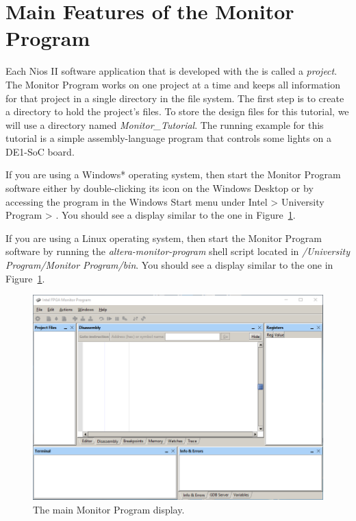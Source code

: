 \documentclass[11pt, twoside, pdftex]{article}
\begin{document}
\section{Main Features of the Monitor Program}

Each Nios II software application that is developed with the
\productNameMed{} is called a {\it project}. 
The Monitor Program works on one project at a time and keeps all information for that project in a single directory in the file
system. The first step is to create a directory to hold the project's files. To store the design files for this tutorial, 
we will use a directory named {\it Monitor\_Tutorial}. 
The running example for this tutorial is a simple 
assembly-language program that controls some lights on a 
DE1-SoC board.

If you are using a Windows* operating system, then
start the Monitor Program software either by double-clicking its
icon on the Windows Desktop or by accessing the program in the
{\sf Windows Start} menu under 
{\sf Intel > University Program > \productNameMed{}}. 
You should see a display similar to the one in Figure~\ref{fig:3}.

If you are using a Linux operating system, then
start the Monitor Program software by running the
{\it altera-monitor-program} shell script located in
{\it <path to Intel software>/University Program/Monitor Program/bin}.
You should see a display similar to the one in Figure~\ref{fig:3}.

\begin{figure}[H]
   \begin{center}
      \includegraphics[scale=0.6]{screenshots/figure3.png}
   \end{center}
   \caption{The main Monitor Program display.} 
	\label{fig:3}
\end{figure}
\end{document}

